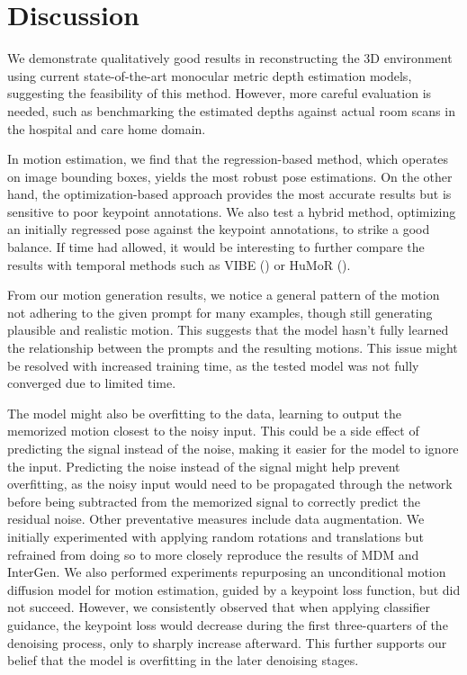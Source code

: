 \chapter{Discussion}

We demonstrate qualitatively good results in reconstructing the 3D environment using current state-of-the-art monocular metric depth estimation models, suggesting the feasibility of this method. However, more careful evaluation is needed, such as benchmarking the estimated depths against actual room scans in the hospital and care home domain.

In motion estimation, we find that the regression-based method, which operates on image bounding boxes, yields the most robust pose estimations. On the other hand, the optimization-based approach provides the most accurate results but is sensitive to poor keypoint annotations. We also test a hybrid method, optimizing an initially regressed pose against the keypoint annotations, to strike a good balance. If time had allowed, it would be interesting to further compare the results with temporal methods such as VIBE (\cite{kocabas2019vibe}) or HuMoR (\cite{rempe2021humor}). 

From our motion generation results, we notice a general pattern of the motion not adhering to the given prompt for many examples, though still generating plausible and realistic motion. This suggests that the model hasn't fully learned the relationship between the prompts and the resulting motions. This issue might be resolved with increased training time, as the tested model was not fully converged due to limited time.

The model might also be overfitting to the data, learning to output the memorized motion closest to the noisy input. This could be a side effect of predicting the signal instead of the noise, making it easier for the model to ignore the input. Predicting the noise instead of the signal might help prevent overfitting, as the noisy input would need to be propagated through the network before being subtracted from the memorized signal to correctly predict the residual noise. Other preventative measures include data augmentation. We initially experimented with applying random rotations and translations but refrained from doing so to more closely reproduce the results of MDM and InterGen. We also performed experiments repurposing an unconditional motion diffusion model for motion estimation, guided by a keypoint loss function, but did not succeed. However, we consistently observed that when applying classifier guidance, the keypoint loss would decrease during the first three-quarters of the denoising process, only to sharply increase afterward. This further supports our belief that the model is overfitting in the later denoising stages.

